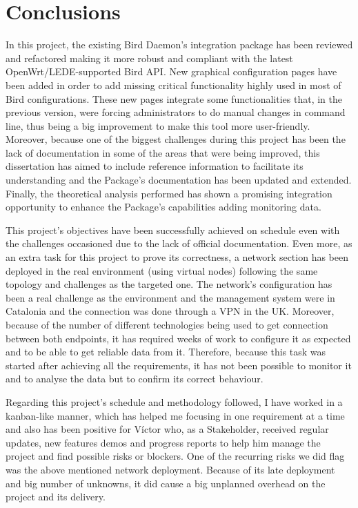 \chapter{Conclusions}
\label{ch:conclusions}
In this project, the existing Bird Daemon's integration package has been reviewed and refactored making it more robust and compliant with the latest OpenWrt/LEDE-supported Bird API. New graphical configuration pages have been added in order to add missing critical functionality highly used in most of Bird configurations. 
These new pages integrate some functionalities that, in the previous version, were forcing administrators to do manual changes in command line, thus being a big improvement to make this tool more user-friendly. Moreover, because one of the biggest challenges during this project has been the lack of documentation in some of the areas that were being improved, this dissertation has aimed to include reference information to facilitate its understanding and the Package's documentation has been updated and extended.
Finally, the theoretical analysis performed has shown a promising integration opportunity to enhance the Package's capabilities adding monitoring data.

This project's objectives have been successfully achieved on schedule even with the challenges occasioned due to the lack of official documentation. Even more, as an extra task for this project to prove its correctness, a network section has been deployed in the real environment (using virtual nodes) following the same topology and challenges as the targeted one. The network's configuration has been a real challenge as the environment and the management system were in Catalonia and the connection was done through a VPN in the UK. Moreover, because of the number of different technologies being used to get connection between both endpoints, it has required weeks of work to configure it as expected and to be able to get reliable data from it. Therefore, because this task was started after achieving all the requirements, it has not been possible to monitor it and to analyse the data but to confirm its correct behaviour.

Regarding this project's schedule and methodology followed, I have worked in a kanban-like manner, which has helped me focusing in one requirement at a time and also has been positive for V\'{i}ctor who, as a Stakeholder, received regular updates, new features demos and progress reports to help him manage the project and find possible risks or blockers. One of the recurring risks we did flag was the above mentioned network deployment. Because of its late deployment and  big number of unknowns, it did cause a big unplanned overhead on the project and its delivery.

